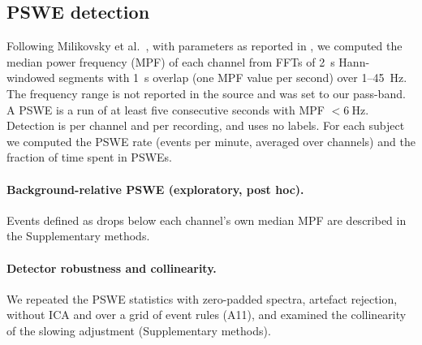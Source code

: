 \subsection{PSWE detection}\label{sec:pswe}
Following Milikovsky et al.\ \cite{B1}, with parameters as reported in \cite{B3}, we computed the
median power frequency (MPF) of each channel from FFTs of \SI{2}{\second} Hann-windowed segments with
\SI{1}{\second} overlap (one MPF value per second) over 1--\SI{45}{\hertz}. The frequency range is not
reported in the source and was set to our pass-band. A PSWE is a run of at least five consecutive
seconds with MPF $<\SI{6}{\hertz}$. Detection is per channel and per recording, and uses no labels.
For each subject we computed the PSWE rate (events per minute, averaged over channels) and the
fraction of time spent in PSWEs.

\paragraph{Background-relative PSWE (exploratory, post hoc).} Events defined as drops below each channel's own median MPF are described in the Supplementary methods.

\paragraph{Detector robustness and collinearity.} We repeated the PSWE statistics with zero-padded spectra, artefact rejection, without ICA and over a grid of event rules (A11), and examined the collinearity of the slowing adjustment (Supplementary methods).

